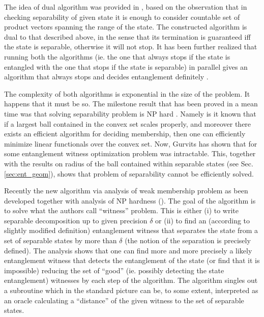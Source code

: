 \documentclass[twocolumn,aps,rmp]{revtex4}
\begin{document}
The idea of dual algorithm was provided in \cite{HulpkeAlgorithm},
based on the observation that in checking separability of given state
it is enough to consider countable set of product vectors spanning the
range of the state. The constructed algorithm is dual to that
described above, in the sense that its termination is guaranteed iff
the state is separable, otherwise it will not stop.  It has been
further realized that running both the algorithms (ie.  the one that
always stops if the state is entangled with the one that stops if the
state is separable) in parallel gives an algorithm that always stops
and decides entanglement definitely \cite{HulpkeAlgorithm}.

The complexity of both algorithms is exponential in the size of the
problem. It happens that it must be so. The milestone result that has
been proved in a mean time was that solving separability problem is NP
hard \cite{GurvitzNPHard,Gurvits_match_2002,Gurvits_complex_2003}.
Namely is it known \cite{YudinN_complex_1976} that if a largest ball
contained in the convex set scales properly, and moreover there exists
an efficient algorithm for deciding membership, then one can
efficiently minimize linear functionals over the convex set.  Now,
Gurvits has shown that for some entanglement witness optimization
problem was intractable. This, together with the results on radius of
the ball contained within separable states (see
Sec. \ref{sec:ent_geom}), shows that problem of separability cannot be
efficiently solved.


Recently the new algorithm via analysis of weak membership problem as
been developed together with analysis of NP hardness
(\cite{IoannouAlgorithm1,IoannouAlgorithm2,IoannouAlgorithm3}). The
goal of the algorithm is to solve what the authors call ``witness''
problem.  This is either (i) to write separable decomposition up to
given precision $\delta$ or (ii) to find an (according to slightly
modified definition) entanglement witness that separates the state
from a set of separable states by more than $\delta$ (the notion of
the separation is precisely defined). The analysis shows that one can
find more and more precisely a likely entanglement witness that
detects the entanglement of the state (or find that it is impossible)
reducing the set of ``good'' (ie. possibly detecting the state
entanglement) witnesses by each step of the algorithm. The algorithm
singles out a subroutine which in the standard picture
\cite{sep1996,Terhal2000-laa} can be, to some extent, interpreted as
an oracle calculating a ``distance'' of the given witness to the set
of separable states.
\end{document}
